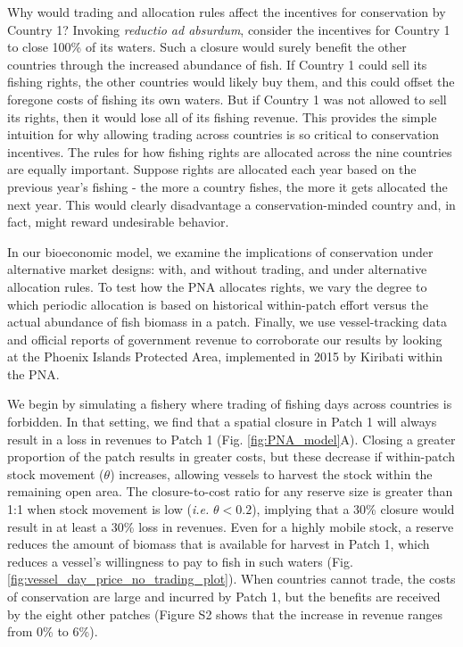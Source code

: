 \documentclass[12pt]{article}
\begin{document}
Why would trading and allocation rules affect the incentives for conservation by Country 1?  Invoking \emph{reductio ad absurdum}, consider the incentives for Country 1 to close 100\% of its waters. Such a closure would surely benefit the other countries through the increased abundance of fish.  If Country 1 could sell its fishing rights, the other countries would likely buy them, and this could offset the foregone costs of fishing its own waters. But if Country 1 was not allowed to sell its rights, then it would lose all of its fishing revenue.  This provides the simple intuition for why allowing trading across countries is so critical to conservation incentives. The rules for how fishing rights are allocated across the nine countries are equally important. Suppose rights are allocated each year based on the previous year's fishing - the more a country fishes, the more it gets allocated the next year. This would clearly disadvantage a conservation-minded country and, in fact, might reward undesirable behavior.

In our bioeconomic model, we examine the implications of conservation under alternative market designs: with, and without trading, and under alternative allocation rules. To test how the PNA allocates rights, we vary the degree to which periodic allocation is based on historical within-patch effort versus the actual abundance of fish biomass in a patch. Finally, we use vessel-tracking data and official reports of government revenue to corroborate our results by looking at the Phoenix Islands Protected Area, implemented in 2015 by Kiribati within the PNA. 

We begin by simulating a fishery where trading of fishing days across countries is forbidden. In that setting, we find that a spatial closure in Patch 1 will always result in a loss in revenues to Patch 1 (Fig. \ref{fig:PNA_model}A). Closing a greater proportion of the patch results in greater costs, but these decrease if within-patch stock movement ($\theta$) increases, allowing vessels to harvest the stock within the remaining open area. The closure-to-cost ratio for any reserve size is greater than 1:1 when stock movement is low (\emph{i.e.} $\theta < 0.2$), implying that a 30\% closure would result in at least a 30\% loss in revenues. Even for a highly mobile stock, a reserve reduces the amount of biomass that is available for harvest in Patch 1, which reduces a vessel's willingness to pay to fish in such waters (Fig. \ref{fig:vessel_day_price_no_trading_plot}). When countries cannot trade, the costs of conservation are large and incurred by Patch 1, but the benefits are received by the eight other patches (Figure S2 shows that the increase in revenue ranges from 0\% to 6\%).
\end{document}
